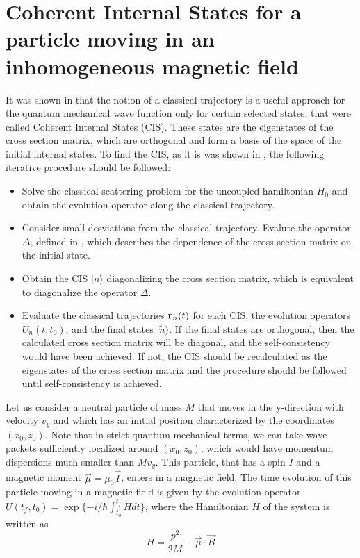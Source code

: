 \documentclass[aps,preprint,prl]{revtex4-2}
\newcommand{\be}{\begin{equation}}
\newcommand{\ee}{\end{equation}}
\begin{document}
\section{Coherent Internal States for  a particle moving in an inhomogeneous
 magnetic field}

It was shown in \cite{sara} that the notion of a classical trajectory is
a useful approach for the quantum mechanical wave function only for
certain selected states, that were called Coherent Internal States (CIS).
These states are the eigenstates of the cross section matrix, 
which are orthogonal and form a basis of the space of the initial internal 
states.
To find the CIS, as it is was shown in \cite{sara}, the 
following iterative procedure should be followed:
\begin{itemize}
\item Solve the classical scattering problem for the uncoupled 
hamiltonian $H_0$ and obtain the 
evolution operator along the classical trajectory. 
\item Consider small desviations from the classical 
trajectory. Evalute the operator $\Delta$, defined in \cite{2}, which
describes the dependence of the cross section matrix on the initial state.
\item Obtain the CIS $|n\rangle$ diagonalizing the cross section matrix, which is
equivalent to diagonalize the operator $\Delta$. 
\item Evaluate the  classical trajectories ${\bf r}_n(t)$ for each CIS, 
the evolution operators $U_n(t,t_0)$, and the final states $|\tilde{n}\rangle$.
If the final states are orthogonal, then the calculated cross section matrix 
will be diagonal, and the self-consistency would have been achieved. 
If not, the CIS should be  recalculated as the eigenstates of the cross section
matrix and the procedure should be followed until self-consistency is achieved.
\end{itemize}

Let us consider a neutral particle of mass $M$ that moves in the y-direction 
with velocity $v_y$ and which has an 
initial position characterized by the coordinates $(x_0, z_0)$. Note that
in strict quantum mechanical terms, we can take wave 
packets sufficiently localized around $(x_0, z_0)$, which would have momentum 
dispersions much smaller than $M v_y$.
This particle, that has a spin $I$ and a magnetic moment $\vec \mu = \mu_0
\vec I$, enters in a magnetic field.
The time evolution of this particle moving in a magnetic field is given by the 
evolution operator ${U}(t_f,t_0) = \exp \{-i/\hbar \int_{t_0}^{t_f} {H}
dt \} $, where the Hamiltonian  $ H $ of the system is written as
\be
 H = \frac{p^2}{2M}  - \vec{\mu} \cdot \vec{B}
\label{ham}
\ee 
\end{document}

